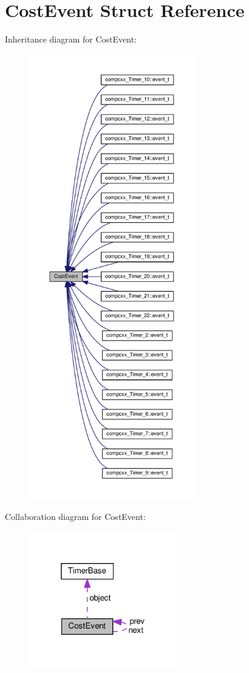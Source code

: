 \hypertarget{structCostEvent}{}\section{Cost\+Event Struct Reference}
\label{structCostEvent}


Inheritance diagram for Cost\+Event\+:\nopagebreak
\begin{figure}[H]
\begin{center}
\leavevmode
\includegraphics[height=550pt]{structCostEvent__inherit__graph}
\end{center}
\end{figure}


Collaboration diagram for Cost\+Event\+:\nopagebreak
\begin{figure}[H]
\begin{center}
\leavevmode
\includegraphics[width=184pt]{structCostEvent__coll__graph}
\end{center}
\end{figure}
